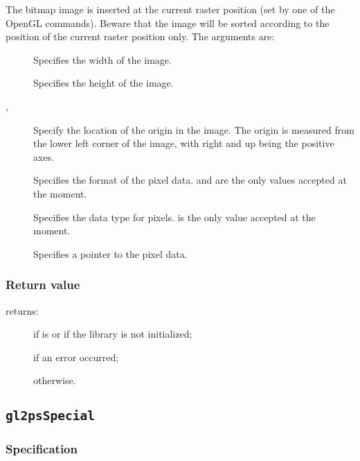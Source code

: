The bitmap image is inserted at the current raster position (set by
one of the  OpenGL commands). Beware that the image
will be sorted according to the position of the current raster
position only. The arguments are:

\begin{description}
\item[] Specifies the width of the image.
\item[] Specifies the height of the image.
\item[, ] Specify the location of the origin in the
  image.  The origin is measured from the lower left corner of the image,
  with right and up being the positive axes.
\item[] Specifies the format of the pixel data.  and
   are the only values accepted at the moment.
\item[] Specifies the data type for pixels.  is the
  only value accepted at the moment.
\item[] Specifies a pointer to the pixel data.
\end{description}

\subsubsection{Return value}

\noindent{} returns:
\begin{description}
\item[] if  is  or if the
  library is not initialized;
\item[] if an error occurred;
\item[] otherwise.
\end{description}


\subsection{\texttt{gl2psSpecial}}
\label{sec:gl2psSpecial}

\subsubsection{Specification}

